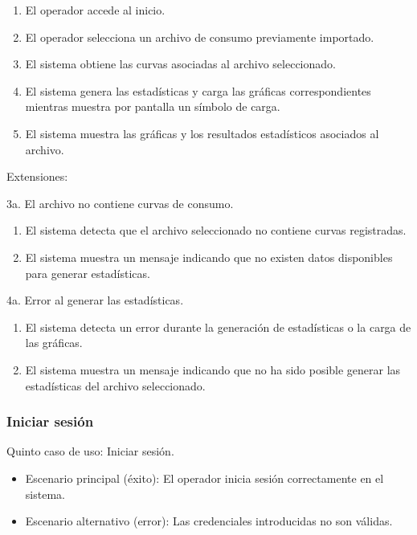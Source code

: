 \documentclass[12pt,a4paper]{report}
\begin{document}
\begin{enumerate}[leftmargin=1.5cm]
    \item El operador accede al inicio.
    \item El operador selecciona un archivo de consumo previamente importado.
    \item El sistema obtiene las curvas asociadas al archivo seleccionado.
    \item El sistema genera las estadísticas y carga las gráficas correspondientes mientras muestra por pantalla un símbolo de carga.
    \item El sistema muestra las gráficas y los resultados estadísticos asociados al archivo.
\end{enumerate}

\medskip

\noindent Extensiones:

3a. El archivo no contiene curvas de consumo.
\begin{enumerate}[leftmargin=1.5cm]
    \item El sistema detecta que el archivo seleccionado no contiene curvas registradas.
    \item El sistema muestra un mensaje indicando que no existen datos disponibles para generar estadísticas.
\end{enumerate}

\medskip

4a. Error al generar las estadísticas.
\begin{enumerate}[leftmargin=1.5cm]
    \item El sistema detecta un error durante la generación de estadísticas o la carga de las gráficas.
    \item El sistema muestra un mensaje indicando que no ha sido posible generar las estadísticas del archivo seleccionado.
\end{enumerate}

\medskip

\subsubsection{Iniciar sesión}

\noindent Quinto caso de uso: Iniciar sesión.

\begin{itemize}[leftmargin=1.5cm]
    \item Escenario principal (éxito): El operador inicia sesión correctamente en el sistema.
    \item Escenario alternativo (error): Las credenciales introducidas no son válidas.
\end{itemize}
\end{document}
